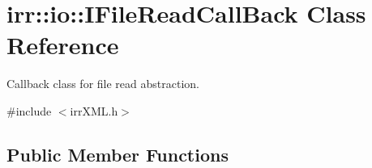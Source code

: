 \hypertarget{classirr_1_1io_1_1IFileReadCallBack}{}\section{irr\+:\+:io\+:\+:I\+File\+Read\+Call\+Back Class Reference}
\label{classirr_1_1io_1_1IFileReadCallBack}


Callback class for file read abstraction.  




{\ttfamily \#include $<$irr\+X\+M\+L.\+h$>$}

\subsection*{Public Member Functions}
